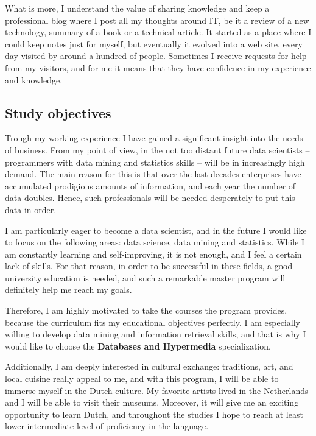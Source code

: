 \documentclass[a4paper,12pt]{article}
\begin{document}
What is more, I understand the value of sharing knowledge and keep a professional blog where I post all my thoughts around IT, be it a review of a new technology, summary of a book or a technical article. It started as a place where I could keep notes just for myself, but eventually it evolved into a web site, every day visited by around a hundred of people. Sometimes I receive requests for help from my visitors, and for me it means that they have confidence in my experience and knowledge.

\subsection*{Study objectives}

Trough my working experience I have gained a significant insight into the needs of business. From my point of view, in the not too distant future data scientists -- programmers with data mining and statistics skills -- will be in increasingly high demand. The main reason for this is that over the last decades enterprises have accumulated prodigious amounts of information, and each year the number of data doubles. Hence, such professionals will be needed desperately to put this data in order.

I am particularly eager to become a data scientist, and in the future I would like to focus on the following areas: data science, data mining and statistics. While I am constantly learning and self-improving, it is not enough, and I feel a certain lack of skills. For that reason, in order to be successful in these fields, a good university education is needed, and such a remarkable master program will definitely help me reach my goals.

Therefore, I am highly motivated to take the courses the program provides, because the curriculum fits my educational objectives perfectly. I am especially willing to develop data mining and information retrieval skills, and that is why I would like to choose the \textbf{Databases and Hypermedia} specialization.

Additionally, I am deeply interested in cultural exchange: traditions, art, and local cuisine really appeal to me, and with this program, I will be able to immerse myself in the Dutch culture. My favorite artists lived in the Netherlands and I will be able to visit their museums. Moreover, it will give me an exciting opportunity to learn Dutch, and throughout the studies I hope to reach at least lower intermediate level of proficiency in the language.
\end{document}
